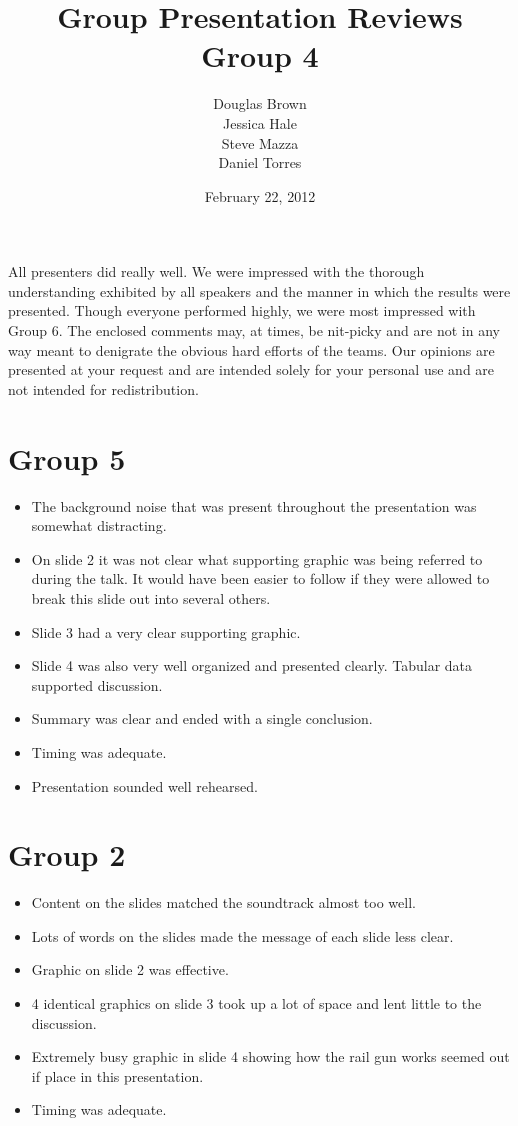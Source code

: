 \documentclass[letterpaper,12pt]{article}
\title{Group Presentation Reviews \\ \large Group 4}
\author{Douglas Brown \\ Jessica Hale \\ Steve Mazza \\ Daniel Torres}
\date{February 22, 2012}
\begin{document}
\maketitle

All presenters did really well.  We were impressed with the thorough understanding exhibited by all speakers and the manner in which the results were presented.  Though everyone performed highly, we were most impressed with Group 6.  The enclosed comments may, at times, be nit-picky and are not in any way meant to denigrate the obvious hard efforts of the teams. Our opinions are presented at your request and are intended solely for your personal use and are not intended for redistribution. 

\section*{Group 5}
  \begin{itemize}
    \item The background noise that was present throughout the presentation was somewhat distracting.
	\item On slide 2 it was not clear what supporting graphic was being referred to during the talk. It would have been easier to follow if they were allowed to break this slide out into several others.
	\item Slide 3 had a very clear supporting graphic. 
	\item Slide 4 was also very well organized and presented clearly. Tabular data supported discussion. 
	\item Summary was clear and ended with a single conclusion. 
	\item Timing was adequate. 
	\item Presentation sounded well rehearsed.
  \end{itemize}

\section*{Group 2}
\begin{itemize}
  \item Content on the slides matched the soundtrack almost too well.
  \item Lots of words on the slides made the message of each slide less clear.
  \item Graphic on slide 2 was effective.
  \item 4 identical graphics on slide 3 took up a lot of space and lent little to the discussion.
  \item Extremely busy graphic in slide 4 showing how the rail gun works seemed out if place in this presentation.
  \item Timing was adequate.
\end{itemize}
\end{document}
